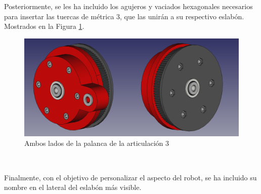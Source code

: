 \newpage
Posteriormente, se les ha incluido los agujeros y vaciados hexagonales necesarios para insertar las tuercas de métrica 3, que las unirán a su respectivo eslabón. Mostrados 
en la Figura \ref{fig:polea_show}.
\begin{figure} [ht!]
  \begin{center}
    \includegraphics[width=14cm]{figs/polea_show 2.png}
  \end{center}
  \caption{Ambos lados de la palanca de la articulación 3}
  \label{fig:polea_show}
\end{figure}\ 


Finalmente, con el objetivo de personalizar el aspecto del robot, se ha incluido su nombre en el lateral del eslabón más visible.
\newpage
